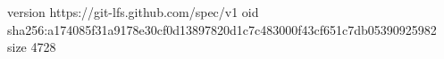 version https://git-lfs.github.com/spec/v1
oid sha256:a174085f31a9178e30cf0d13897820d1c7c483000f43cf651c7db05390925982
size 4728
